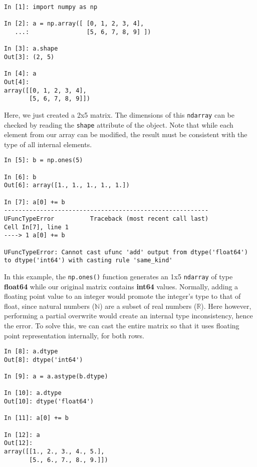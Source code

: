 \begin{lstlisting}[style=pythonstyle]
In [1]: import numpy as np

In [2]: a = np.array([ [0, 1, 2, 3, 4],
   ...:                [5, 6, 7, 8, 9] ])

In [3]: a.shape
Out[3]: (2, 5)

In [4]: a
Out[4]:
array([[0, 1, 2, 3, 4],
       [5, 6, 7, 8, 9]])
\end{lstlisting}

Here, we just created a 2x5 matrix. The dimensions of this \texttt{ndarray}
can be checked by reading the \texttt{shape} attribute of the object. Note that
while each element from our array can be modified, the result must be consistent
with the type of all internal elements.


\begin{lstlisting}[style=pythonstyle]
In [5]: b = np.ones(5)

In [6]: b
Out[6]: array([1., 1., 1., 1., 1.])

In [7]: a[0] += b
---------------------------------------------------------
UFuncTypeError          Traceback (most recent call last)
Cell In[7], line 1
----> 1 a[0] += b

UFuncTypeError: Cannot cast ufunc 'add' output from dtype('float64') to dtype('int64') with casting rule 'same_kind'
\end{lstlisting}

In this example, the \texttt{np.ones()} function generates an 1x5
\texttt{ndarray} of type \textbf{float64} while our original matrix contains
\textbf{int64} values. Normally, adding a floating point value to an integer
would promote the integer's type to that of float, since natural numbers
($\mathbb{N}$) are a subset of real numbers ($\mathbb{R}$). Here however,
performing a partial overwrite would create an internal type inconsistency,
hence the error. To solve this, we can cast the entire matrix so that it uses
floating point representation internally, for both rows.

\begin{lstlisting}[style=pythonstyle]
In [8]: a.dtype
Out[8]: dtype('int64')

In [9]: a = a.astype(b.dtype)

In [10]: a.dtype
Out[10]: dtype('float64')

In [11]: a[0] += b

In [12]: a
Out[12]:
array([[1., 2., 3., 4., 5.],
       [5., 6., 7., 8., 9.]])
\end{lstlisting}

